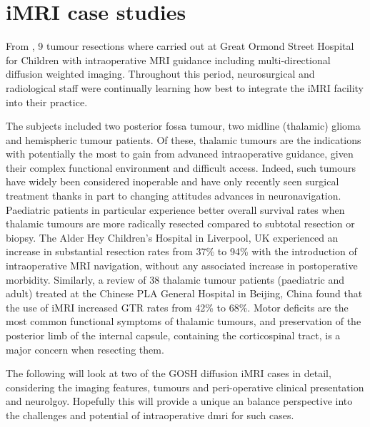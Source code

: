 \clearpage
\section{iMRI case studies}

From , 9  tumour resections where carried out at Great Ormond Street Hospital for Children with intraoperative MRI guidance including multi-directional diffusion weighted imaging.
Throughout this period, neurosurgical and radiological staff were continually learning how best to integrate the iMRI facility into their practice.

The subjects included two posterior fossa tumour, two midline (thalamic) glioma and  hemispheric tumour patients.
Of these, thalamic tumours are the indications with potentially the most to gain from advanced intraoperative guidance, given their complex functional environment and difficult access.
Indeed, such tumours have widely been considered inoperable and have only recently seen surgical treatment thanks in part to changing attitudes\autocite{Souweidane1996,Puget2007} advances in neuronavigation.\autocite{Sunderland2021}
Paediatric patients in particular\autocite{Ferroli2023} experience better overall survival rates when thalamic tumours are more radically resected compared to subtotal resection or biopsy.\autocite{Cinalli2018a}
The Alder Hey Children's Hospital in Liverpool, UK experienced an increase in substantial resection  rates from 37\% to 94\% with the introduction of intraoperative MRI navigation, without any associated increase in postoperative morbidity.\autocite{Sunderland2021}
Similarly, a review of 38 thalamic tumour patients (paediatric and adult) treated at the Chinese PLA General Hospital in Beijing, China found that the use of iMRI increased GTR rates from 42\% to 68\%.\autocite{Zheng2016}
Motor deficits are the most common functional symptoms of thalamic tumours,\autocite{Puget2007, Zheng2016, Palmisciano2021} and preservation of the posterior limb of the internal capsule, containing the corticospinal tract, is a major concern when resecting them.

The following will look at two of the GOSH diffusion iMRI cases in detail, considering the imaging features, tumours and peri-operative clinical presentation and neurolgoy.
Hopefully this will provide a unique an balance perspective into the challenges and potential of intraoperative \gls{dmri} for such cases.

